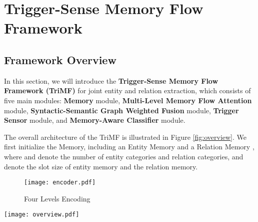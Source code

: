 \documentclass[sigconf]{acmart}
\begin{document}
\section{Trigger-Sense Memory Flow Framework}

\subsection{Framework Overview}

In this section, we will introduce the \textbf{Trigger-Sense Memory Flow Framework (TriMF)} for joint entity and relation extraction, which consists of five main modules: \textbf{Memory} module,  \textbf{Multi-Level Memory Flow Attention} module, \textbf{Syntactic-Semantic Graph Weighted Fusion} module, \textbf{Trigger Sensor} module, and \textbf{Memory-Aware Classifier} module. 


The overall architecture of the TriMF is illustrated in Figure \ref{fig:overview}.  We first initialize the Memory, including an Entity Memory   and a Relation Memory  , where  and  denote the number of entity categories and relation categories,  and  denote the slot size of entity memory and the relation memory. 




\begin{figure}[h]
  \centering
  \texttt{[image: encoder.pdf]}
  \caption{ Four Levels Encoding}
   \label{fig:encode}
\end{figure}

\begin{figure*}[h]
  \centering
  \texttt{[image: overview.pdf]}
  \caption{Trigger-Sense Memory Flow Framework (TriMF) Overview}
   \label{fig:overview}
\end{figure*}
\end{document}
